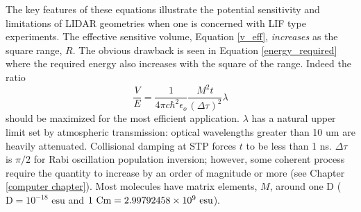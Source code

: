The key features of these equations illustrate the potential sensitivity and limitations of LIDAR geometries when one is concerned with LIF type experiments. The effective sensitive volume, Equation \ref{v_eff}, \emph{increases} as the square range, $R$. The obvious drawback is seen in Equation \ref{energy_required} where the required energy also increases with the square of the range. Indeed the ratio
\begin{equation}
\frac{V}{E}
=
\frac{1}{4 \pi c \hbar^2 \epsilon_o}
\frac{M^2 t}{(\Delta\tau)^2}
\lambda
\label{LIDAR eff}
\end{equation}
should be maximized for the most efficient application. $\lambda$ has a natural upper limit set by atmospheric transmission: optical wavelengths greater than 10 um are heavily attenuated. Collisional damping at STP forces $t$ to be less than 1 ns. $\Delta\tau$ is $\pi/2$ for Rabi oscillation population inversion; however, some coherent process require the quantity to increase by an order of magnitude or more (see Chapter \ref{computer chapter}). Most molecules have matrix elements, $M$, around one D ($\mbox{D}=10^{-18}\mbox{ esu}$ and $1\mbox{ Cm}=2.99792458\times10^{9}\mbox{ esu}$).

